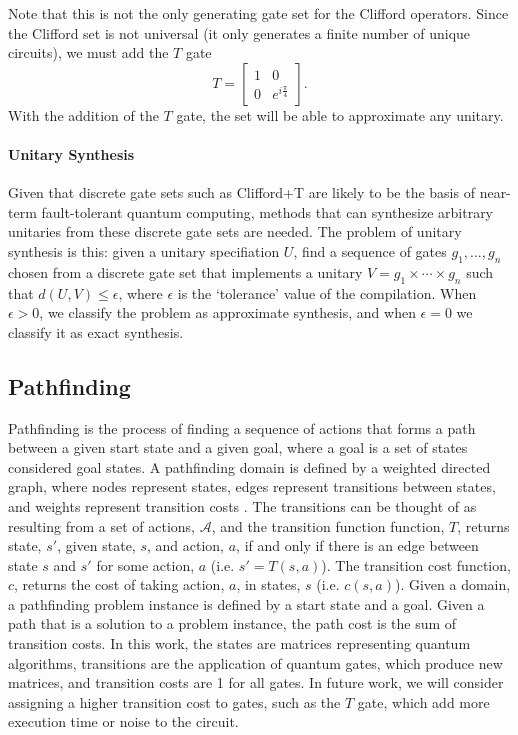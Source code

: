 \documentclass[letterpaper]{article} %
\begin{document}
Note that this is not the only generating gate set for the Clifford operators.
Since the Clifford set is not universal (it only generates a finite number of unique circuits),
we must add the $T$ gate
\begin{equation}
	T =
	\begin{bmatrix}
		1 & 0 \\
		0 & e^{i\frac{\pi}{4}}
	\end{bmatrix}.
\end{equation}
With the addition of the $T$ gate, the set will be able to approximate any unitary.





\paragraph{Unitary Synthesis}

Given that discrete gate sets such as Clifford+T are likely to be the basis of near-term fault-tolerant quantum computing,
methods that can synthesize arbitrary unitaries from these discrete gate sets are needed.
The problem of unitary synthesis is this: given a unitary specifiation $U$, find a sequence of gates
${g_1,...,g_n}$ chosen from a discrete gate set that implements a unitary $V = g_1 \times \cdots \times g_n$
such that $d(U,V)\leq \epsilon$, where $\epsilon$ is the `tolerance' value of the compilation.
When $\epsilon > 0$, we classify the problem as approximate synthesis, and when $\epsilon=0$ we classify it as exact synthesis.



\subsection{Pathfinding}
Pathfinding is the process of finding a sequence of actions that forms a path between a given start state and a given goal, where a goal is a set of states considered goal states. A pathfinding domain is defined by a weighted directed graph, where nodes represent states, edges represent transitions between states, and weights represent transition costs \cite{pohl1970heuristic}. The transitions can be thought of as resulting from a set of actions, $\mathcal{A}$, and the transition function function, $T$, returns state, $s'$, given state, $s$, and action, $a$, if and only if there is an edge between state $s$ and $s'$ for some action, $a$ (i.e. $s' = T(s,a)$). The transition cost function, $c$, returns the cost of taking action, $a$, in states, $s$ (i.e. $c(s,a)$). Given a domain, a pathfinding problem instance is defined by a start state and a goal. Given a path that is a solution to a problem instance, the path cost is the sum of transition costs. In this work, the states are matrices representing quantum algorithms, transitions are the application of quantum gates, which produce new matrices, and transition costs are 1 for all gates. In future work, we will consider assigning a higher transition cost to gates, such as the $T$ gate, which add more execution time or noise to the circuit.
\end{document}
